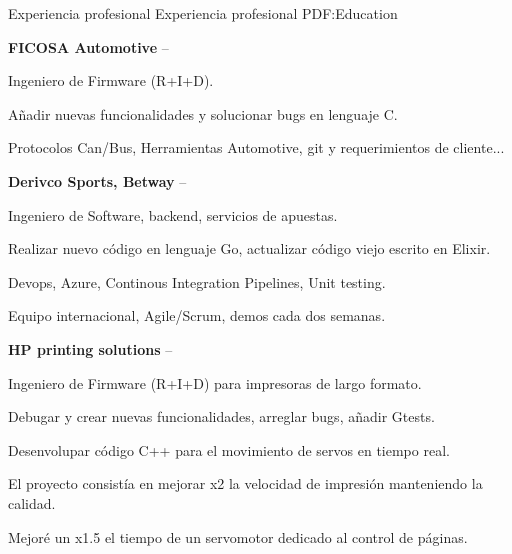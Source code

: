 \documentclass[letterpaper,MMMyyyy,nonstopmode]{simpleresumecv}
\newcommand\tab[1][0.5cm]{\hspace*{#1}}
\begin{document}
\begin{Body}

\Section
{Experiencia profesional}
{Experiencia profesional}
{PDF:Education}

\Entry



{\textbf{FICOSA Automotive}}
\hfill
{} --

\tab Ingeniero de Firmware (R+I+D). 

\tab Añadir nuevas funcionalidades y solucionar bugs en lenguaje C. 

\tab Protocolos Can/Bus, Herramientas Automotive, git y requerimientos de cliente...

\Gap

{\textbf{Derivco Sports, Betway}}
\hfill
{} --

\tab Ingeniero de Software, backend, servicios de apuestas. 

\tab Realizar nuevo código en lenguaje Go, actualizar código viejo escrito en Elixir. 

\tab Devops, Azure, Continous Integration Pipelines, Unit testing. 

\tab Equipo internacional, Agile/Scrum, demos cada dos semanas. 

\Gap


{\textbf{HP printing solutions}}
\hfill
{} --

\tab Ingeniero de Firmware (R+I+D) para impresoras de largo formato. 

\tab Debugar y crear nuevas funcionalidades, arreglar bugs, añadir Gtests. 

\tab Desenvolupar código C++ para el movimiento de servos en tiempo real. 

\tab El proyecto consistía en mejorar x2 la velocidad de impresión manteniendo la calidad.

\tab Mejoré un x1.5 el tiempo de un servomotor dedicado al control de páginas. 


\end{Body}
\end{document}
